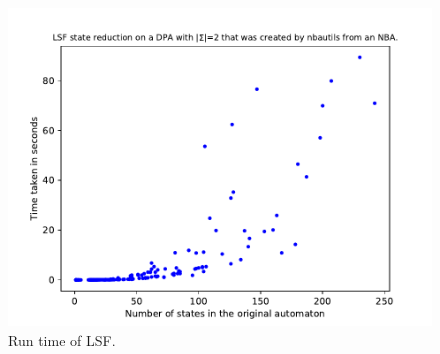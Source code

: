 \begin{figure}
	\includegraphics[page=1,height=.3\textheight]{../data/analysis/lsf/detnbaut_ap1.pdf} 
	\caption{Run time of LSF.}
	\label{exp:fig:lsf_time}
\end{figure}